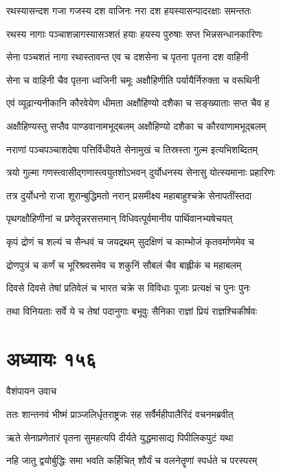 \twolineshloka
{रथस्यासन्दश गजा गजस्य दश वाजिनः}
{नरा दश हयस्यासन्पादरक्षाः समन्ततः}


\twolineshloka
{रथस्य नागाः पञ्चाशन्नागस्यासञ्शतं हयाः}
{हयस्य पुरुषाः सप्त भिन्नसन्धानकारिणः}


\twolineshloka
{सेना पञ्चशतं नागा रथास्तावन्त एव च}
{दशसेना च पृतना पृतना दश वाहिनी}


\twolineshloka
{सेना च वाहिनी चैव पृतना ध्वजिनी चमूः}
{अक्षौहिणीति पर्यायैर्निरुक्ता च वरूथिनी}


\twolineshloka
{एवं व्यूढान्यनीकानि कौरवेयेण धीमता}
{अक्षौहिण्यो दशैका च सङ्ख्याताः सप्त चैव ह}


\twolineshloka
{अक्षौहिण्यस्तु सप्तैव पाण्डवानामभूद्बलम्}
{अक्षौहिण्यो दशैका च कौरवाणामभूद्बलम्}


\twolineshloka
{नराणां पञ्चपञ्चाशदेषा पत्तिर्विधीयते}
{सेनामुखं च तिस्रस्ता गुल्म इत्यभिशब्दितम्}


\twolineshloka
{त्रयो गुल्मा गणस्त्वासीद्गणास्त्वयुतशोऽभवन्}
{दुर्योधनस्य सेनासु योत्स्यमानाः प्रहारिणः}


\threelineshloka
{तत्र दुर्योधनो राजा शूरान्बुद्धिमतो नरान्}
{प्रसमीक्ष्य महाबाहुश्चक्रे सेनापतींस्तदा}
{}


\twolineshloka
{पृथगक्षौहिणीनां च प्रणेतॄन्नरसत्तमान्}
{विधिवत्पूर्वमानीय पार्थिवानभ्यषेचयत्}


\twolineshloka
{कृपं द्रोणं च शल्यं च सैन्धवं च जयद्रथम्}
{सुदक्षिणं च काम्भोजं कृतवर्माणमेव च}


\twolineshloka
{द्रोणपुत्रं च कर्णं च भूरिश्रवसमेव च}
{शकुनिं सौबलं चैव बाह्लीकं च महाबलम्}


\twolineshloka
{दिवसे दिवसे तेषां प्रतिवेलं च भारत}
{चक्रे स विविधाः पूजाः प्रत्यक्षं च पुनः पुनः}


\twolineshloka
{तथा विनियताः सर्वे ये च तेषां पदानुगाः}
{बभूवुः सैनिका राज्ञां प्रियं राज्ञश्चिकीर्षवः}


\chapter{अध्यायः १५६}
\twolineshloka
{वैशंपायन उवाच}
{}


\twolineshloka
{ततः शान्तनवं भीष्मं प्राञ्जलिर्धृतराष्ट्रजः}
{सह सर्वैर्महीपालैरिदं वचनमब्रवीत्}


\twolineshloka
{ऋते सेनाप्रणेतारं पृतना सुमहत्यपि}
{दीर्यते युद्धमासाद्य पिपीलिकपुटं यथा}


\twolineshloka
{नहि जातु द्वयोर्बुद्धिः समा भवति कर्हिचित्}
{शौर्यं च वलनेतॄणां स्पर्धते च परस्परम्}


